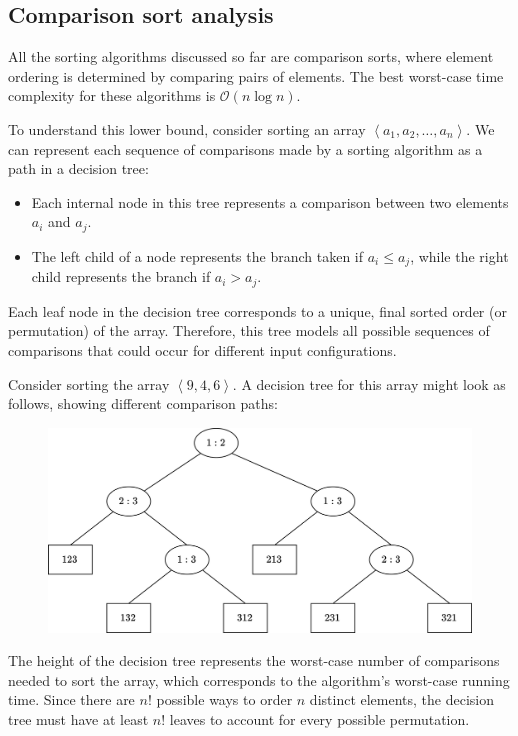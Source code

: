 \subsection{Comparison sort analysis}
All the sorting algorithms discussed so far are comparison sorts, where element ordering is determined by comparing pairs of elements. 
The best worst-case time complexity for these algorithms is $\mathcal{O}(n\log n)$. 

To understand this lower bound, consider sorting an array $\left\langle a_1,a_2,\dots,a_n\right\rangle$. 
We can represent each sequence of comparisons made by a sorting algorithm as a path in a decision tree:
\begin{itemize}
    \item Each internal node in this tree represents a comparison between two elements $a_i$ and $a_j$.
    \item The left child of a node represents the branch taken if $a_i \leq a_j$, while the right child represents the branch if $a_i > a_j$. 
\end{itemize}
Each leaf node in the decision tree corresponds to a unique, final sorted order (or permutation) of the array. 
Therefore, this tree models all possible sequences of comparisons that could occur for different input configurations.
\begin{example}
    Consider sorting the array $\left\langle 9,4,6\right\rangle$. 
    A decision tree for this array might look as follows, showing different comparison paths:
    \begin{figure}[H]
        \centering
        \includegraphics[width=0.8\linewidth]{images/tree1.png}
    \end{figure}
\end{example}
The height of the decision tree represents the worst-case number of comparisons needed to sort the array, which corresponds to the algorithm's worst-case running time.
Since there are $n!$ possible ways to order $n$ distinct elements, the decision tree must have at least $n!$ leaves to account for every possible permutation.

